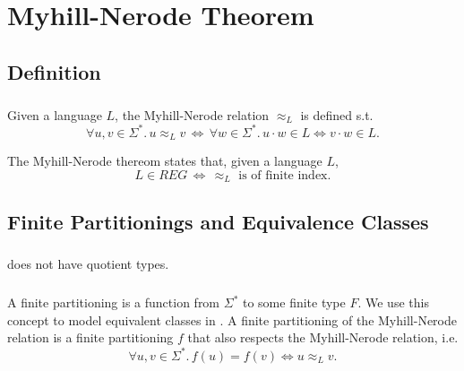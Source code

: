 \documentclass[11pt,a4paper,oneside]{book}
\begin{document}
            \paragraph{} 


            

        \chapter{Myhill-Nerode Theorem}

            \section{Definition}

                \paragraph{} Given a language $L$, the Myhill-Nerode relation $\approx_L$ is defined s.t. 
                \[
                    \forall u, v \in \Sigma^*. \,
                    u \approx_L v \, \Longleftrightarrow \, 
                    \forall w \in \Sigma^*.\, u \cdot w \in L \Leftrightarrow v \cdot w \in L.
                \]


                The Myhill-Nerode thereom states that, given a language $L$,
                \[
                    L \in REG \, \Longleftrightarrow \, \approx_L \mbox{ is of finite index.}
                \]

            \section{Finite Partitionings and Equivalence Classes}

                \paragraph{}
                    \coq does not have quotient types. 

                \paragraph{} 
                    A finite partitioning is a function from $\Sigma^*$ to some finite type $F$. 
                    We use this concept to model equivalent classes in \coq. 
                    A finite partitioning of the Myhill-Nerode relation is a finite partitioning $f$ that also respects the Myhill-Nerode relation, i.e. 
                    \[
                        \forall u, v \in \Sigma^*. \,
                        f(u) = f(v) \Leftrightarrow u \approx_L v.
                    \]
                    
\end{document}
